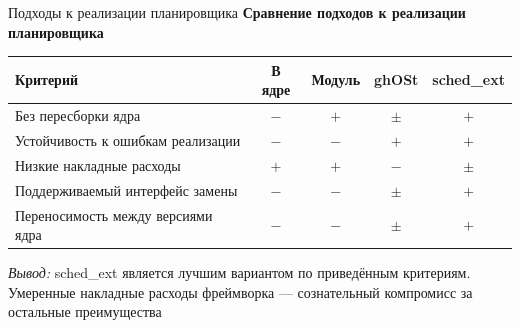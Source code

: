 \documentclass[aspectratio=169,11pt]{beamer}
\begin{document}
\begin{frame}{Подходы к реализации планировщика}
        \footnotesize
        \centering\textbf{Сравнение подходов к реализации планировщика}\par
        \vspace{0.5em}
        \centering
        \scriptsize
        \begin{tabular}{@{}lcccc@{}}
                \toprule
                Критерий & В ядре & Модуль & ghOSt & sched\_ext \\
                \midrule
                Без пересборки ядра                & $-$ & $+$ & $\pm$ & $+$ \\
                Устойчивость к ошибкам реализации    & $-$ & $-$ & $+$   & $+$ \\
                Низкие накладные расходы           & $+$ & $+$ & $-$   & $\pm$ \\
                Поддерживаемый интерфейс замены    & $-$ & $-$ & $\pm$ & $+$ \\
                Переносимость между версиями ядра  & $-$ & $-$ & $\pm$ & $+$ \\
                \bottomrule
        \end{tabular}

        \vspace{1.8em}
        \raggedright
        \scriptsize\textit{Вывод:} sched\_ext является лучшим
        вариантом по приведённым критериям. Умеренные накладные расходы фреймворка —
        сознательный компромисс за остальные преимущества
\end{frame}
\end{document}
